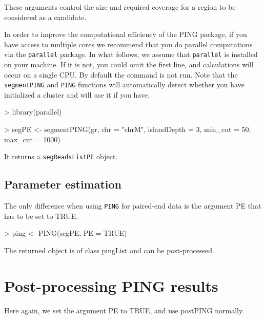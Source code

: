 \documentclass[11pt]{article}
\begin{document}
These arguments control the size and required coverage for a region to be
considered as a candidate.

In order to improve the computational efficiency of the PING package, if you
have access to multiple cores we recommend that you do parallel computations via
the \texttt{parallel} package. In what follows, we assume that \texttt{parallel}
is installed on your machine. If it is not, you could omit the first line, and
calculations will occur on a single CPU. By default the command is not run. Note
that the \texttt{segmentPING} and \texttt{PING} functions will automatically
detect whether you have initialized a cluster and will use it if you have.

\begin{Schunk}
\begin{Sinput}
> library(parallel)
\end{Sinput}
\end{Schunk}


\begin{Schunk}
\begin{Sinput}
> segPE <- segmentPING(gr, chr = "chrM", islandDepth = 3, min_cut = 50, 
     max_cut = 1000)
\end{Sinput}
\end{Schunk}

It returns a \texttt{segReadsListPE} object.


\subsection{Parameter estimation}
The only difference when using \texttt{PING} for paired-end data is the argument PE that has to be set to TRUE.

\begin{Schunk}
\begin{Sinput}
> ping <- PING(segPE, PE = TRUE)
\end{Sinput}
\end{Schunk}
The returned object is of class pingList and can be post-processed.


\section{Post-processing PING results}
Here again, we set the argument PE to TRUE, and use postPING normally.
\end{document}
